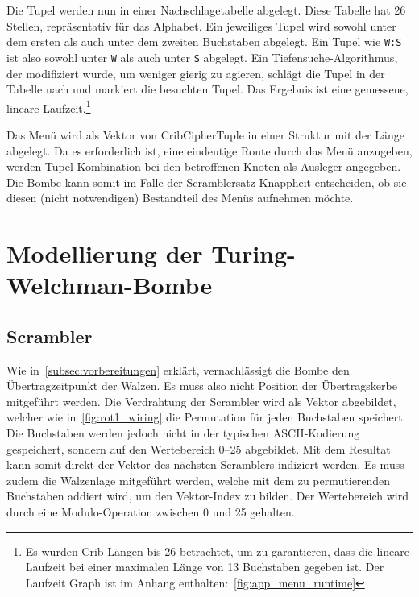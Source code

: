 \noindent

Die Tupel werden nun in einer \glqq Nachschlagetabelle\grqq{} abgelegt.
Diese Tabelle hat 26 Stellen, repräsentativ für das Alphabet.
Ein jeweiliges Tupel wird sowohl unter dem ersten als auch unter dem zweiten Buchstaben abgelegt. 
Ein Tupel wie \texttt{W:S} ist also sowohl unter \texttt{W} als auch unter \texttt{S} abgelegt.
Ein Tiefensuche-Algorithmus, der modifiziert wurde, um weniger \glqq gierig\grqq{} zu agieren, schlägt die Tupel in der Tabelle nach und markiert die besuchten Tupel.
Das Ergebnis ist eine gemessene, lineare Laufzeit.\footnote{Es wurden Crib-Längen bis 26 betrachtet, um zu garantieren, dass die lineare Laufzeit bei einer maximalen Länge von 13 Buchstaben gegeben ist.
Der Laufzeit Graph ist im Anhang enthalten:~\cref{fig:app_menu_runtime}}

Das Menü wird als Vektor von \glqq CribCipherTuple\grqq{} in einer Struktur mit der Länge abgelegt.
Da es erforderlich ist, eine eindeutige \glqq Route\grqq{} durch das Menü anzugeben, werden Tupel-Kombination bei den betroffenen Knoten als Ausleger angegeben. 
Die Bombe kann somit im Falle der \glqq Scramblersatz-Knappheit\grqq{} entscheiden, ob sie diesen (nicht notwendigen) Bestandteil des Menüs aufnehmen möchte.

\section{Modellierung der Turing-Welchman-Bombe}\label{sec:model}
\subsection{Scrambler}\label{subsec:impl_scrambler}
Wie in~\cref{subsec:vorbereitungen} erklärt, vernachlässigt die Bombe den Übertragzeitpunkt der Walzen.
Es muss also nicht Position der Übertragskerbe mitgeführt werden.
Die Verdrahtung der Scrambler wird als Vektor abgebildet, welcher wie in~\cref{fig:rot1_wiring} die Permutation für jeden Buchstaben speichert.
Die Buchstaben werden jedoch nicht in der typischen ASCII-Kodierung gespeichert, sondern auf den Wertebereich 0--25 abgebildet.
Mit dem Resultat kann somit direkt der Vektor des nächsten Scramblers indiziert werden.
Es muss zudem die Walzenlage mitgeführt werden, welche mit dem zu permutierenden Buchstaben addiert wird, um den Vektor-Index zu bilden.
Der Wertebereich wird durch eine Modulo-Operation zwischen 0 und 25 gehalten.

